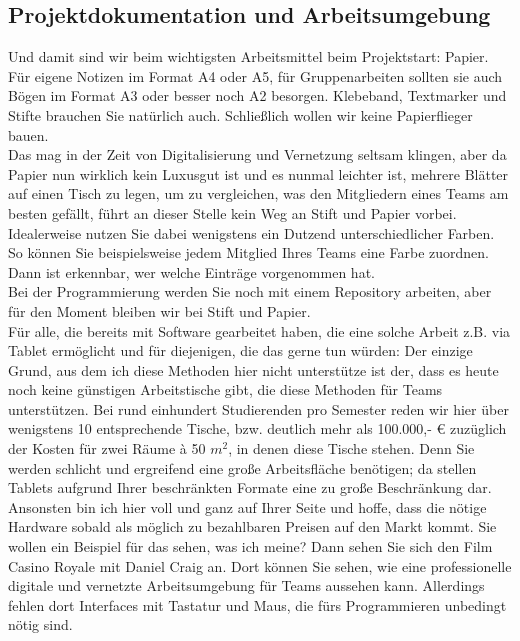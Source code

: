 \subsection{Projektdokumentation und Arbeitsumgebung}

Und damit sind wir beim wichtigsten Arbeitsmittel beim Projektstart: Papier. Für eigene Notizen im Format A4 oder A5, für Gruppenarbeiten sollten sie auch Bögen im Format A3 oder besser noch A2 besorgen. Klebeband, Textmarker und Stifte brauchen Sie natürlich auch. Schließlich wollen wir keine Papierflieger bauen.\\

Das mag in der Zeit von Digitalisierung und Vernetzung seltsam klingen, aber da Papier nun wirklich kein Luxusgut ist und es nunmal leichter ist, mehrere Blätter auf einen Tisch zu legen, um zu vergleichen, was den Mitgliedern eines Teams am besten gefällt, führt an dieser Stelle kein Weg an Stift und Papier vorbei. Idealerweise nutzen Sie dabei wenigstens ein Dutzend unterschiedlicher Farben. So können Sie beispielsweise jedem Mitglied Ihres Teams eine Farbe zuordnen. Dann ist erkennbar, wer welche Einträge vorgenommen hat.\\

Bei der Programmierung werden Sie noch mit einem Repository arbeiten, aber für den Moment bleiben wir bei Stift und Papier.\\

Für alle, die bereits mit Software gearbeitet haben, die eine solche Arbeit z.B. via Tablet ermöglicht und für diejenigen, die das gerne tun würden: Der einzige Grund, aus dem ich diese Methoden hier nicht unterstütze ist der, dass es heute noch keine günstigen Arbeitstische gibt, die diese Methoden für Teams unterstützen. Bei rund einhundert Studierenden pro Semester reden wir hier über wenigstens 10 entsprechende Tische, bzw. deutlich mehr als 100.000,- € zuzüglich der Kosten für zwei Räume à 50 \(m^2\), in denen diese Tische stehen. Denn Sie werden schlicht und ergreifend eine große Arbeitsfläche benötigen; da stellen Tablets aufgrund Ihrer beschränkten Formate eine zu große Beschränkung dar. Ansonsten bin ich hier voll und ganz auf Ihrer Seite und hoffe, dass die nötige Hardware sobald als möglich zu bezahlbaren Preisen auf den Markt kommt. Sie wollen ein Beispiel für das sehen, was ich meine? Dann sehen Sie sich den Film \grqq{}Casino Royale\grqq{} mit Daniel Craig an. Dort können Sie sehen, wie eine professionelle digitale und vernetzte Arbeitsumgebung für Teams aussehen kann. Allerdings fehlen dort Interfaces mit Tastatur und Maus, die fürs Programmieren unbedingt nötig sind.

